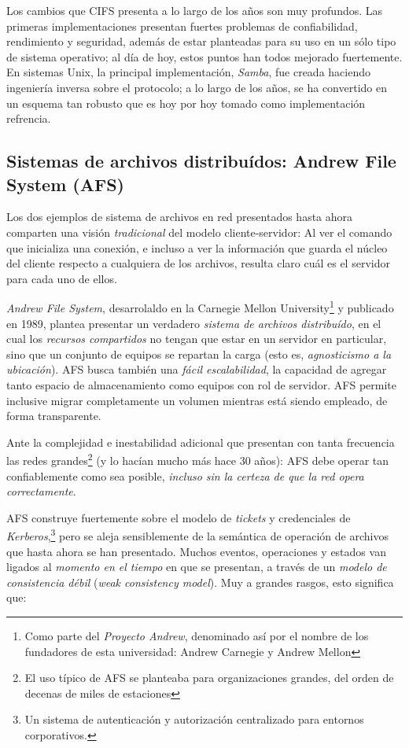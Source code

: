 \documentclass[11pt,fleqn]{book} %
\begin{document}
Los cambios que CIFS presenta a lo largo de los años son muy
profundos. Las primeras implementaciones presentan fuertes problemas
de confiabilidad, rendimiento y seguridad, además de estar planteadas
para su uso en un sólo tipo de sistema operativo; al día de hoy, estos
puntos han todos mejorado fuertemente. En sistemas Unix, la principal
implementación, \emph{Samba}, fue creada haciendo ingeniería inversa sobre
el protocolo; a lo largo de los años, se ha convertido en un esquema
tan robusto que es hoy por hoy tomado como implementación refrencia.
\subsection{Sistemas de archivos distribuídos: Andrew File System (AFS)}
\label{sec-6-4-3}



Los dos ejemplos de sistema de archivos en red presentados hasta ahora
comparten una visión \emph{tradicional} del modelo cliente-servidor: Al ver
el comando que inicializa una conexión, e incluso a ver la
información que guarda el núcleo del cliente respecto a cualquiera de
los archivos, resulta claro cuál es el servidor para cada uno de
ellos.

\emph{Andrew File System}, desarrolaldo en la Carnegie Mellon
University\footnote{Como parte del \emph{Proyecto Andrew}, denominado así por
el nombre de los fundadores de esta universidad: Andrew Carnegie y
Andrew Mellon } y publicado en 1989, plantea presentar un verdadero
\emph{sistema de archivos distribuído}, en el cual los \emph{recursos compartidos} no tengan que estar en un servidor en particular, sino
que un conjunto de equipos se repartan la carga (esto es,
\emph{agnosticismo a la ubicación}). AFS busca también una \emph{fácil escalabilidad}, la capacidad de agregar tanto espacio de
almacenamiento como equipos con rol de servidor. AFS permite inclusive
migrar completamente un volumen mientras está siendo empleado, de
forma transparente.

Ante la complejidad e inestabilidad adicional que presentan con
tanta frecuencia las redes grandes\footnote{El uso típico de AFS se
planteaba para organizaciones grandes, del orden de decenas de miles
de estaciones } (y lo hacían mucho más hace 30 años): AFS debe operar
tan confiablemente como sea posible, \emph{incluso sin la certeza de que la red opera correctamente}.

AFS construye fuertemente sobre el modelo de \emph{tickets} y credenciales
de \emph{Kerberos},\footnote{Un sistema de autenticación y autorización
centralizado para entornos corporativos. } pero se aleja sensiblemente
de la semántica de operación de archivos que hasta ahora se han
presentado. Muchos eventos, operaciones y estados van ligados al
\emph{momento en el tiempo} en que se presentan, a través de un \emph{modelo de consistencia débil} (\emph{weak consistency model}). Muy a grandes rasgos,
esto significa que:
\end{document}
